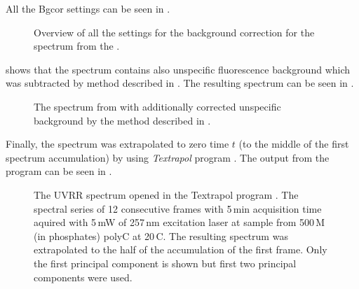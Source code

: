All the Bgcor settings can be seen in
.

\begin{figure}
	\centering
	\caption[%
		Bgcor -- settings.
	]{%
		Overview of all the settings for the background correction for the spectrum
		from the
		.
	}
	\label{\figlabel{background:bgcor_settings}}
\end{figure}

 shows that the spectrum contains also unspecific
fluorescence background which was subtracted by method described in
\textcite{Palacky2011}.
The resulting spectrum can be seen in
.

\begin{figure}
	\centering
	
	\vspace{3mm}
	\caption[%
		Single frame with corrected background.
	]{%
		The spectrum from
		with additionally corrected unspecific background by the method described
		in
		\textcite{Palacky2011}.
	}
	\label{\figlabel{background:corrected_frame}}
\end{figure}

Finally, the spectrum was extrapolated to zero time $t$ (to the middle of the
first spectrum accumulation) by using \emph{Textrapol} program
\parencite{Textrapol2017}.
The output from the program can be seen in
.

\begin{figure}
	\centering
	\caption[%
		Textrapol -- program for extrapolation and interpolation of series of
		spectra using PCA.
	]{%
		The UVRR spectrum opened in the Textrapol program
		\parencite{Textrapol2017}.
		The spectral series of 12 consecutive frames with 5\,min acquisition time
		aquired with 5\,mW of 257\,nm excitation laser at sample
		from 500\,M (in phosphates) polyC at 20\,\textdegree{}C.
		The resulting spectrum was extrapolated to the half of the accumulation of
		the first frame. Only the first principal component is shown but first
		two principal components were used.
	}
	\label{\figlabel{background:textrapol}}
\end{figure}